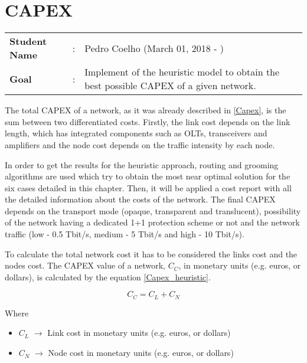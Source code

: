 \clearpage

\section{CAPEX}
\begin{tcolorbox}	
\begin{tabular}{p{2.75cm} p{0.2cm} p{10.5cm}} 	
\textbf{Student Name}  &:& Pedro Coelho    (March 01, 2018 - )\\
\textbf{Goal}          &:& Implement of the heuristic model to obtain the best possible CAPEX of a given network.
\end{tabular}
\end{tcolorbox}
\vspace{11pt}

The total CAPEX of a network, as it was already described in \ref{Capex}, is the sum between two differentiated costs. Firstly, the link cost depends on the link length, which has integrated components such as OLTs, transceivers and amplifiers and the node cost depends on the traffic intensity by each node.

In order to get the results for the heuristic approach, routing and grooming algorithms are used which try to obtain the most near optimal solution for the six cases detailed in this chapter. Then, it will be applied a cost report with all the detailed information about the costs of the network. The final CAPEX depends on the transport mode (opaque, transparent and translucent), possibility of the network having a dedicated 1+1 protection scheme or not and the network traffic (low - 0.5 Tbit/s, medium - 5 Tbit/s and high - 10 Tbit/s).

To calculate the total network cost it has to be considered the links cost and the nodes cost. The CAPEX value of a network, $C_C$, in monetary units (e.g. euros, or dollars), is calculated by the equation \ref{Capex_heuristic}.

\begin{equation}
C_C = C_L + C_N
\label{Capex_heuristic}
\end{equation}

Where

\begin{itemize}
\item{$C_L$				$\rightarrow$	Link cost in monetary units (e.g. euros, or dollars)}
\item{$C_N$				$\rightarrow$	Node cost in monetary units (e.g. euros, or dollars)}
\end{itemize}

